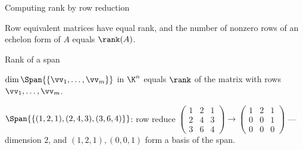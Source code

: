 \begin{frame}{Computing rank by row reduction}
\begin{theorem}
Row equivalent matrices have equal rank, and the number of nonzero rows of an echelon form of $A$ equals
$\rank(A)$.
\end{theorem}

\pause

\begin{steps}
\end{steps}
\end{frame}

\begin{frame}{Rank of a span}
\begin{theorem}
$\dim\Span{\{\vv_1,\ldots,\vv_m\}}$ in $\K^n$ equals $\rank$ of the matrix with rows $\vv_1,\ldots,\vv_m$.
\end{theorem}

\pause

\begin{example}
$\Span{\{(1,2,1),(2,4,3),(3,6,4)\}}$: row reduce
$\left(\begin{smallmatrix}1&2&1\\2&4&3\\3&6&4\end{smallmatrix}\right) \to \left(\begin{smallmatrix}1&2&1\\0&0&1\\0&0&0\end{smallmatrix}\right)$
— dimension $2$, and $(1,2,1),(0,0,1)$ form a basis of the span.
\end{example}
\end{frame}

